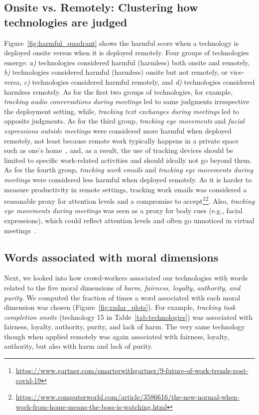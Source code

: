 \subsection{Onsite vs. Remotely: Clustering how technologies are judged}
Figure~\ref{fig:harmful_quadrant} shows the harmful score when a technology is deployed onsite versus when it is deployed remotely. Four groups of technologies emerge: \emph{a)} technologies considered harmful (harmless) both onsite and remotely, \emph{b)} technologies considered harmful (harmless) onsite but not remotely, or vice-versa, \emph{c)} technologies considered harmful remotely, and \emph{d)} technologies considered harmless remotely. As for the first two groups of technologies, for example, \emph{tracking audio conversations during meetings} led to same judgments irrespective the deployment setting, while, \emph{tracking text exchanges during meetings} led to opposite judgments. As for the third group, \emph{tracking eye movements} and \emph{facial expressions outside meetings} were considered more harmful when deployed remotely, not least because remote work typically happens in a private space~\cite{nippert2010islands} such as one's home~\cite{rudnicka2020eworklife}, and, as a result, the use of tracking devices should be limited to specific work-related activities and should ideally not go beyond them. As for the fourth group, \emph{tracking work emails} and \emph{tracking eye movements during meetings} were considered less harmful when deployed remotely. As it is harder to measure productivity in remote settings, tracking work emails was considered a reasonable proxy for attention levels and a compromise to accept\footnote{\url{https://www.gartner.com/smarterwithgartner/9-future-of-work-trends-post-covid-19}}\footnote{\url{https://www.computerworld.com/article/3586616/the-new-normal-when-work-from-home-means-the-boss-is-watching.html}}. Also, \emph{tracking eye movements during meetings} was seen as a proxy for body cues (e.g., facial expressions), which could reflect attention levels and often go unnoticed in virtual meetings~\cite{choi2021kairos}.

\subsection{Words associated with moral dimensions}
Next, we looked into how crowd-workers associated our technologies with words related to the five moral dimensions of \emph{harm, fairness, loyalty, authority, and purity}. We computed the fraction of times a word associated with each moral dimension was chosen (Figure~\ref{fig:radar_plots}). For example, \emph{tracking task completion onsite} (technology 15 in Table~\ref{tab:technologies}) was associated with fairness, loyalty, authority, purity, and lack of harm. The very same technology though when applied remotely was again associated with fairness, loyalty, authority, but also with harm and lack of purity.

